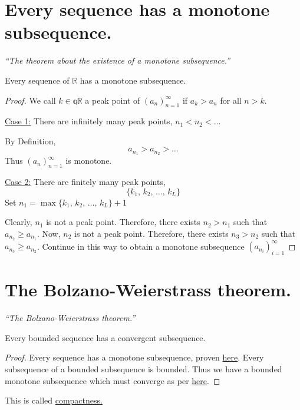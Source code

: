 \documentclass[12pt]{report}
\begin{document}
    \section{Every sequence has a monotone subsequence.}
    \label{Every sequence has a monotone subsequence}
    \textit{``The theorem about the existence of a monotone subsequence.''} \vspace{3mm}
    \begin{theorem}
        Every sequence of \(\mathbb{R}\) has a monotone subsequence.
    \end{theorem}
    \begin{proof}
        We call \(k \in \mathbb{qR}\) a peak point of \(\left(a_n\right)^\infty _{n=1}\) if \(a_k > a_n\) for all \(n >k\).
        
        \underline{Case 1:}
        There are infinitely many peak points, \(n_1 < n_2 < \dots \)
        \vspace{5mm}

        By Definition,
        \[a_{n_1} > a_{n_2} > \dots\]
        Thus \(\left(a_n\right)^\infty _{n=1}\) is monotone.
        \vspace{10mm}

        \underline{Case 2:}
        There are finitely many peak points,
        \[\{k_1, \, k_2, \, \dots , \, k_L\}\]
        Set \(n_1 = \max \{k_1, \, k_2, \, \dots , \, k_L\} + 1\)

        Clearly, \(n_1\) is not a peak point. Therefore, there exists \(n_2 > n_1\) such that \(a_{n_2} \geq a_{n_1}\). Now, \(n_2\) is not a peak point. Therefore, there exists \(n_3 > n_2\) such that \(a_{n_3} \geq a_{n_2}\). Continue in this way to obtain a monotone subsequence \(\left(a_{n_i}\right)^\infty _{i=1}\)
    \end{proof}\newpage
    \section{The Bolzano-Weierstrass theorem.}
    \textit{``The Bolzano-Weierstrass theorem.''} \vspace{3mm}
    \begin{theorem}
        Every bounded sequence has a convergent subsequence.
    \end{theorem}
    \begin{proof}
        Every sequence has a monotone subsequence, proven \hyperref[Every sequence has a monotone subsequence]{here}. Every subsequence of a bounded subsequence is bounded. Thus we have a bounded monotone subsequence which must converge as per \hyperref[Convergence of a bounded, monotone sequence]{here}.
    \end{proof}
    \begin{remark}
        This is called \underline{compactness.}
    \end{remark}
\end{document}
